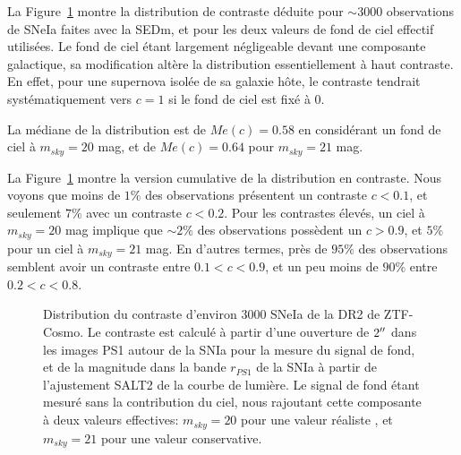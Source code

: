 \documentclass[../main/main.tex]{subfiles}
\begin{document}
La Figure~\ref{fig:dr2contrast} montre la distribution de contraste
déduite pour $\sim3000$ observations de SNeIa faites avec la SEDm, et
pour les deux valeurs de fond de ciel effectif utilisées. Le fond de
ciel étant largement négligeable devant une composante galactique, sa
modification altère la distribution essentiellement à haut contraste. En
effet, pour une supernova isolée de sa galaxie hôte, le contraste
tendrait systématiquement vers $c=1$ si le fond de ciel est fixé à $0$.

La médiane de la distribution est de $Me(c)=0.58$ en considérant un fond de
ciel à $m_{sky}=20$ mag, et de $Me(c)=0.64$ pour $m_{sky}=21$ mag.

La Figure~\ref{fig:dr2contrast} montre la version cumulative de la
distribution en contraste.
Nous voyons que moins de $1\%$ des observations présentent un
contraste $c<0.1$, et seulement $7\%$ avec un contraste $c<0.2$. Pour
les contrastes élevés, un ciel à $m_{sky}=20$ mag implique que $\sim2\%$ des
observations possèdent un $c>0.9$, et $5\%$ pour un ciel à $m_{sky}=21$ mag.
En d'autres termes, près de $95\%$ des observations semblent avoir un
contraste entre $0.1<c<0.9$, et un peu moins de $90\%$ entre $0.2<c<0.8$.

\begin{figure}[ht]
  \centering
  \caption[Distribution du contraste des SNeIa de la DR2 de
  ZTF-Cosmo.]{Distribution du contraste d'environ $3000$ SNeIa de la DR2 de
    ZTF-Cosmo. Le contraste est calculé à partir d'une ouverture de
    $2^{\prime\prime}$ dans les images PS1 autour de la SNIa pour la mesure du
    signal de fond, et de la magnitude dans la bande $r_{PS1}$ de la
    SNIa à partir de l'ajustement SALT2 de la courbe de lumière. Le
    signal de fond étant mesuré sans la contribution du ciel, nous
    rajoutant cette composante à deux valeurs effectives: $m_{sky}=20$
    pour une valeur réaliste \citep{SEDM18}, et $m_{sky}=21$ pour une
    valeur conservative.
  }
  \label{fig:dr2contrast}
\end{figure}
\end{document}
